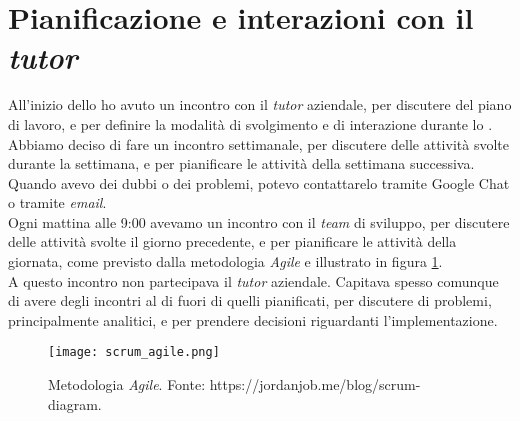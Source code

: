 \section{Pianificazione e interazioni con il \textit{tutor}}
All'inizio dello \stage{} ho avuto un incontro con il \textit{tutor} aziendale, per discutere del piano di lavoro, e per definire la modalità
di svolgimento e di interazione durante lo \stage.\\
Abbiamo deciso di fare un incontro settimanale, per discutere delle attività svolte durante la settimana, e per pianificare le attività
della settimana successiva.\\
Quando avevo dei dubbi o dei problemi, potevo contattarelo tramite Google Chat o tramite \textit{email}.\\
Ogni mattina alle 9:00 avevamo un incontro con il \textit{team} di sviluppo, per discutere delle attività svolte il giorno precedente, e per
pianificare le attività della giornata, come previsto dalla metodologia \textit{Agile} e illustrato in figura \ref*{fig:scrum_agile}.\\
A questo incontro non partecipava il \textit{tutor} aziendale. 
Capitava spesso comunque di avere degli incontri al di fuori di quelli pianificati, per discutere di problemi, principalmente analitici, 
e per prendere decisioni riguardanti l'implementazione.\\

\begin{figure}[h] 
  \centering 
  \texttt{[image: scrum\_agile.png]} 
  \caption{Metodologia \textit{Agile}. Fonte: https://jordanjob.me/blog/scrum-diagram. }
  \label{fig:scrum_agile}
\end{figure}